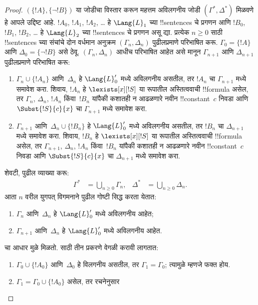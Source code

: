 \documentclass[../../../include/open-logic-section]{subfiles}
\begin{document}
\begin{proof}
$(\{ !A \}, \{\lnot!B\})$ या जोडीचा विस्तार करून महत्तम अविलगनीय जोडी
$(\Gamma^*, \Delta^*)$ मिळवणे हे आपले उद्दिष्ट आहे. $!A_0$, $!A_1$,
$!A_2$, \dots{} हे $\Lang{L}_1$ च्या !!{sentence}s चे प्रगणन आणि $!B_0$,
$!B_1$, $!B_2$, \dots{} हे $\Lang{L}_2$ च्या !!{sentence}s चे प्रगणन असू
द्या. प्रत्येक $n \ge 0$ साठी !!{sentence}s च्या संचांचे दोन वर्धमान अनुक्रम
$(\Gamma_n, \Delta_n)$ पुढीलप्रमाणे परिभाषित करू. $\Gamma_0 = \{ !A\}$
आणि $\Delta_0 = \{\lnot !B \}$ असे ठेवू. $(\Gamma_n, \Delta_n)$ आधीच
परिभाषित आहेत असे मानून $\Gamma_{n+1}$ आणि $\Delta_{n+1}$ पुढीलप्रमाणे
परिभाषित करू:
\begin{enumerate}
\item $\Gamma_n \cup \{!A_n \}$ आणि~$\Delta_n$ हे $\Lang{L}'_0$ मध्ये
  अविलगनीय असतील, तर $!A_n$ चा $\Gamma_{n+1}$ मध्ये समावेश करा. शिवाय,
  $!A_n$ हे $\lexists[x][!S]$ या रूपातील अस्तित्ववाची !!{formula} असेल,
  तर $\Gamma_n$, $\Delta_n$, $!A_n$ किंवा~$!B_n$ यांपैकी कशातही न आढळणारे
  नवीन !!{constant}~$c$ निवडा आणि $\Subst{!S}{c}{x}$ चा $\Gamma_{n+1}$
  मध्ये समावेश करा.
\item $\Gamma_{n+1}$ आणि~$\Delta_n \cup \{!B_n \}$ हे $\Lang{L}'_0$
  मध्ये अविलगनीय असतील, तर $!B_n$ चा $\Delta_{n+1}$ मध्ये समावेश करा.
  शिवाय, $!B_n$ हे $\lexists[x][!S]$ या रूपातील अस्तित्ववाची !!{formula}
  असेल, तर $\Gamma_{n+1}$, $\Delta_n$, $!A_n$ किंवा~$!B_n$ यांपैकी कशातही
  न आढळणारे नवीन !!{constant}~$c$ निवडा आणि $\Subst{!S}{c}{x}$ चा
  $\Delta_{n+1}$ मध्ये समावेश करा.
\end{enumerate}
शेवटी, पुढील व्याख्या करू:
\begin{align*}
  \Gamma^* & = \bigcup_{n\ge 0} \Gamma_n, &
  \Delta^* & = \bigcup_{n\ge 0} \Delta_n.
\end{align*}
आता $n$ वरील युगपत् विगमनाने पुढील गोष्टी सिद्ध करता येतात:
\begin{enumerate}
\item{} $\Gamma_n$ आणि~$\Delta_n$ हे $\Lang{L}'_0$ मध्ये
  अविलगनीय आहेत;
\item{} $\Gamma_{n+1}$ आणि~$\Delta_n$ हे $\Lang{L}'_0$
  मध्ये अविलगनीय आहेत.
\end{enumerate}
 चा आधार  मुळे मिळतो. 
साठी तीन प्रकरणे वेगळी करावी लागतात:
\begin{enumerate}
\item $\Gamma_0 \cup \{!A_0 \}$ आणि~$\Delta_0$ हे विलगनीय असतील, तर
  $\Gamma_1 = \Gamma_0$; त्यामुळे  म्हणजे फक्त
   होय.
\item $\Gamma_1 = \Gamma_0 \cup\{ !A_0\}$ असेल, तर रचनेनुसार

\end{enumerate}
\end{proof}
\end{document}
